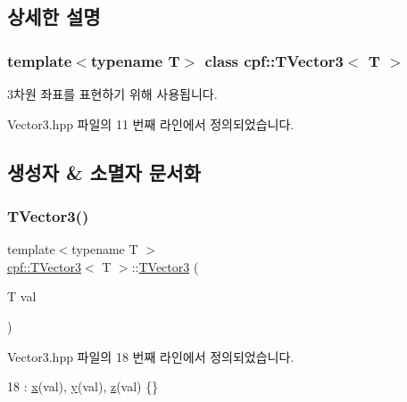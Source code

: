 \subsection{상세한 설명}
\subsubsection*{template$<$typename T$>$\newline
class cpf\+::\+T\+Vector3$<$ T $>$}

3차원 좌표를 표현하기 위해 사용됩니다. 

Vector3.\+hpp 파일의 11 번째 라인에서 정의되었습니다.



\subsection{생성자 \& 소멸자 문서화}
\mbox{\label{classcpf_1_1_t_vector3_a31544bebbd3d8737adf44460256b57fd}} 
\subsubsection{\texorpdfstring{T\+Vector3()}{TVector3()}\hspace{0.1cm}{\footnotesize\ttfamily [1/3]}}
{\footnotesize\ttfamily template$<$typename T $>$ \\
\hyperlink{classcpf_1_1_t_vector3}{cpf\+::\+T\+Vector3}$<$ T $>$\+::\hyperlink{classcpf_1_1_t_vector3}{T\+Vector3} (\begin{DoxyParamCaption}\item[{T}]{val }\end{DoxyParamCaption})\hspace{0.3cm}{\ttfamily [inline]}}



Vector3.\+hpp 파일의 18 번째 라인에서 정의되었습니다.


\begin{DoxyCode}
18 : \hyperlink{classcpf_1_1_t_vector3_ad3df42808358a64c518d6349ede446d8}{x}(val), \hyperlink{classcpf_1_1_t_vector3_a2371a0583e76dcc80c6f10dd168cde1b}{y}(val), \hyperlink{classcpf_1_1_t_vector3_ae7ea5f4b24c3438a44eb6b0fdfe02823}{z}(val) \{\}
\end{DoxyCode}
\mbox{\label{classcpf_1_1_t_vector3_a67fdeb48db080d90957d29b1c75cf3d1}} 

